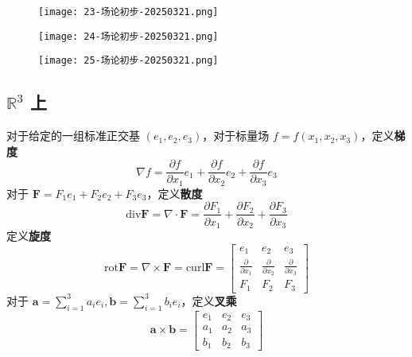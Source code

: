 \begin{figure}[H]
\centering
\texttt{[image: 23-场论初步-20250321.png]}
\label{}
\end{figure}

\begin{figure}[H]
\centering
\texttt{[image: 24-场论初步-20250321.png]}
\label{}
\end{figure}

\begin{figure}[H]
\centering
\texttt{[image: 25-场论初步-20250321.png]}
\label{}
\end{figure}

\subsection{\texorpdfstring{$\mathbb{R}^{3}$}{mathbbR^3} 上}

对于给定的一组标准正交基 $(e_1,e_2,e_3)$，对于标量场 $f=f(x_1,x_2,x_3)$，定义\textbf{梯度}
\[
\nabla f=\frac{ \partial f  }{ \partial x_1 } e_1+\frac{ \partial f  }{ \partial x_2 } e_2+\frac{ \partial f  }{ \partial x_3 } e_3
\]
对于 $\boldsymbol{F}=F_1e_1+F_2e_2+F_3e_3$，定义\textbf{散度}
\[
\mathrm{div}\boldsymbol{F}=\nabla \cdot \boldsymbol{F}=\frac{ \partial F_1 }{ \partial x_1 }+\frac{ \partial F_2 }{ \partial x_2 } +\frac{ \partial F_3 }{ \partial x_3 }
\]
定义\textbf{旋度}
\[
\mathrm{rot}\boldsymbol{F}=\nabla \times \boldsymbol{F}=\mathrm{curl}\boldsymbol{F}=\begin{bmatrix}
e_1 & e_2 & e_3 \\
\frac{ \partial   }{ \partial x_1 }  & \frac{ \partial   }{ \partial x_2 }  & \frac{ \partial   }{ \partial x_3 }  \\
F_1 & F_2 & F_3
\end{bmatrix}
\]
对于 $\boldsymbol{a}=\sum_{i=1}^{3}a_ie_i,\boldsymbol{b}=\sum_{i=1}^{3}b_ie_i$，定义\textbf{叉乘}
\[
\boldsymbol{a}\times \boldsymbol{b}=\begin{bmatrix}
e_1 & e_2 & e_3  \\
a_1 & a_2 & a_3 \\
b_1 & b_2 & b_3
\end{bmatrix}
\]